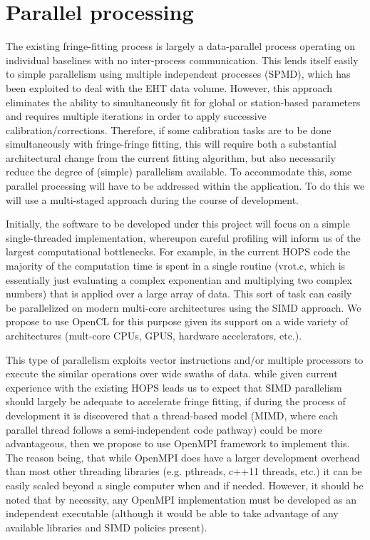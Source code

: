 \documentclass[hidelinks]{article}
\let\Oldsection\section
\renewcommand{\section}{\FloatBarrier\Oldsection}
\begin{document}


\section{Parallel processing}

The existing fringe-fitting process is largely a data-parallel process operating on individual baselines with no inter-process
communication. This lends itself easily to simple parallelism using multiple independent processes (SPMD), which has been exploited
\cite{blackburn2019eht} to deal with the EHT data volume. However, this approach eliminates the ability to simultaneously fit for global or station-based
parameters and requires multiple iterations in order to apply successive calibration/corrections. Therefore, if some calibration tasks are to be
done simultaneously with fringe-fringe fitting, this will require both a substantial architectural change from the current fitting algorithm, but
also necessarily reduce the degree of (simple) parallelism available. To accommodate this, some parallel processing will have to be addressed
within the application. To do this we will use a multi-staged approach during the course of development.

Initially, the software to be developed under this project will focus on a simple single-threaded implementation, whereupon careful
profiling will inform us of the largest computational bottlenecks. For example, in the current HOPS code the majority of
the computation time is spent in a single routine (vrot.c, which is essentially just evaluating a complex exponentian and multiplying two complex numbers) that is applied over
a large array of data. This sort of task can easily be parallelized on modern multi-core architectures using the SIMD approach. We propose to use OpenCL
for this purpose given its support on a wide variety of architectures (mult-core CPUs, GPUS, hardware accelerators, etc.).

This type of parallelism exploits vector instructions and/or multiple processors to execute the similar operations over wide swaths of data. while given current experience with the existing HOPS leads us to expect that SIMD parallelism should largely be adequate to accelerate fringe fitting, if during the process of development it is discovered that a thread-based model (MIMD, where each parallel thread follows a semi-independent code pathway) could be more advantageous, then we propose to use OpenMPI framework to implement this. The reason being, that while OpenMPI does have a larger development overhead than most other threading libraries (e.g. pthreads, c++11 threads, etc.) it can be easily scaled beyond a single computer when and if needed. However, it should be noted that by necessity, any OpenMPI implementation must be developed as an independent executable (although it would be able to take advantage of any available libraries and SIMD policies present). 
\end{document}
